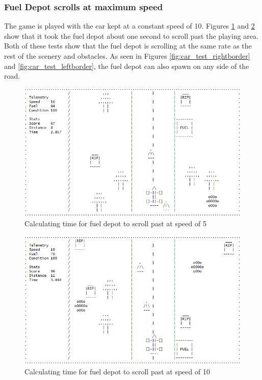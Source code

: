 \documentclass{article}
\begin{document}
\subsubsection*{Fuel Depot scrolls at maximum speed}
The game is played with the car kept at a constant speed of 10. Figures \ref{fig:fueldepot_test_maxspeed} and \ref{fig:fueldepot_test_maxspeed2} show that it took the fuel depot about one second to scroll past the playing area. Both of these tests show that the fuel depot is scrolling at the same rate as the rest of the scenery and obstacles.  As seen in Figures \ref{fig:car_test_rightborder} and \ref{fig:car_test_leftborder}, the fuel depot can also spawn on any side of the road.
\begin{figure}[!ht]
	\begin{center}
	\includegraphics[width=0.63\paperwidth]{images/fueldepot_test_maxspeed}
	\caption{Calculating time for fuel depot to scroll past at speed of 5}
	\label{fig:fueldepot_test_maxspeed} 
	\end{center}
\end{figure}
\begin{figure}[!ht]
	\begin{center}
	\includegraphics[width=0.63\paperwidth]{images/fueldepot_test_maxspeed2}
	\caption{Calculating time for fuel depot to scroll past at speed of 10}
	\label{fig:fueldepot_test_maxspeed2} 
	\end{center}
\end{figure}
\clearpage
\end{document}
